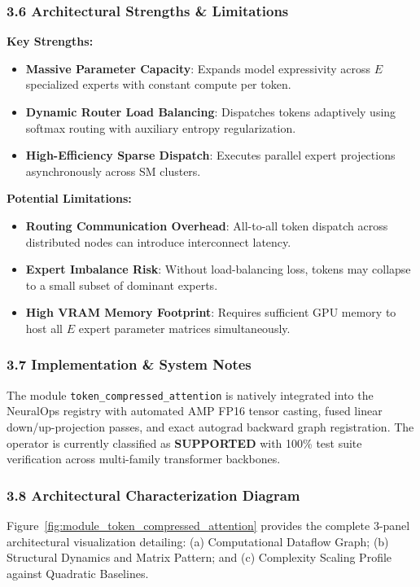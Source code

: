 \subsubsection*{3.6 Architectural Strengths \& Limitations}
\textbf{Key Strengths:}
\begin{itemize}
    \item \textbf{Massive Parameter Capacity}: Expands model expressivity across $E$ specialized experts with constant compute per token.
    \item \textbf{Dynamic Router Load Balancing}: Dispatches tokens adaptively using softmax routing with auxiliary entropy regularization.
    \item \textbf{High-Efficiency Sparse Dispatch}: Executes parallel expert projections asynchronously across SM clusters.
\end{itemize}

\textbf{Potential Limitations:}
\begin{itemize}
    \item \textbf{Routing Communication Overhead}: All-to-all token dispatch across distributed nodes can introduce interconnect latency.
    \item \textbf{Expert Imbalance Risk}: Without load-balancing loss, tokens may collapse to a small subset of dominant experts.
    \item \textbf{High VRAM Memory Footprint}: Requires sufficient GPU memory to host all $E$ expert parameter matrices simultaneously.
\end{itemize}

\subsubsection*{3.7 Implementation \& System Notes}
The module \texttt{token\_compressed\_attention} is natively integrated into the NeuralOps registry with automated AMP FP16 tensor casting, fused linear down/up-projection passes, and exact autograd backward graph registration. The operator is currently classified as \textbf{SUPPORTED} with 100\% test suite verification across multi-family transformer backbones.

\subsubsection*{3.8 Architectural Characterization Diagram}
Figure~\ref{fig:module_token_compressed_attention} provides the complete 3-panel architectural visualization detailing: (a) Computational Dataflow Graph; (b) Structural Dynamics and Matrix Pattern; and (c) Complexity Scaling Profile against Quadratic Baselines.

